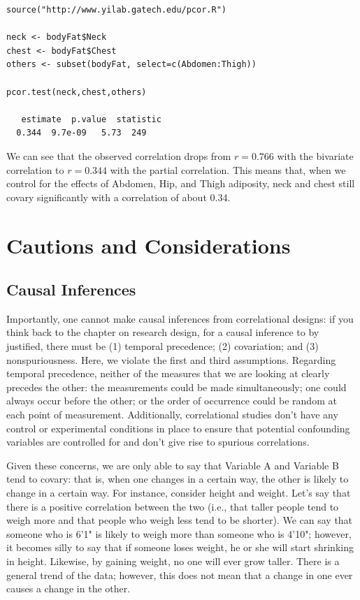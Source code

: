 \begin{framed}
\begin{Verbatim}[samepage=TRUE]
source("http://www.yilab.gatech.edu/pcor.R")

neck <- bodyFat$Neck
chest <- bodyFat$Chest
others <- subset(bodyFat, select=c(Abdomen:Thigh))

pcor.test(neck,chest,others)

   estimate  p.value  statistic
  0.344  9.7e-09   5.73  249
\end{Verbatim}
\end{framed}

We can see that the observed correlation drops from \(r=0.766\) with the bivariate correlation to \(r=0.344\) with the partial correlation. This means that, when we control for the effects of Abdomen, Hip, and Thigh adiposity, neck and chest still covary significantly with a correlation of about 0.34.

\section{Cautions and Considerations}
\subsection{Causal Inferences}
Importantly, one cannot make causal inferences from correlational designs: if you think back to the chapter on research design, for a causal inference to by justified, there must be (1) temporal precedence; (2) covariation; and (3) nonspuriousness. Here, we violate the first and third assumptions. Regarding temporal precedence, neither of the measures that we are looking at clearly precedes the other: the measurements could be made simultaneously; one could always occur before the other; or the order of occurrence could be random at each point of measurement. Additionally, correlational studies don't have any control or experimental conditions in place to ensure that potential confounding variables are controlled for and don't give rise to spurious correlations.

Given these concerns, we are only able to say that Variable A and Variable B tend to covary: that is, when one changes in a certain way, the other is likely to change in a certain way. For instance, consider height and weight. Let's say that there is a positive correlation between the two (i.e., that taller people tend to weigh more and that people who weigh less tend to be shorter). We can say that someone who is 6'1" is likely to weigh more than someone who is 4'10"; however, it becomes silly to say that if someone loses weight, he or she will start shrinking in height. Likewise, by gaining weight, no one will ever grow taller. There is a general trend of the data; however, this does not mean that a change in one ever causes a change in the other.

